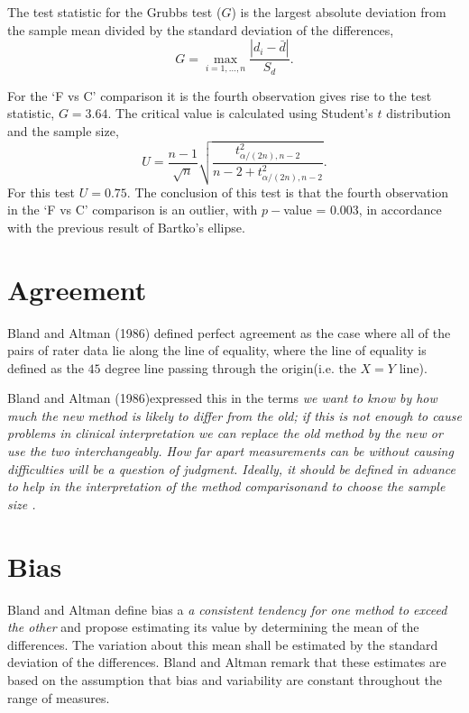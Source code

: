 \documentclass[12pt, a4paper]{report}
\theoremstyle{plain}
\theoremstyle{definition}
\theoremstyle{remark}
\begin{document}
	The test statistic for the Grubbs test ($G$) is the largest
	absolute deviation from the sample mean divided by the standard
	deviation of the differences,
	\begin{equation}
	G =  \displaystyle\max_{i=1,\ldots, n}\frac{\left \vert d_i -
		\bar{d}\right\vert}{S_{d}}.
	\end{equation}
	
	For the `F vs C' comparison it is the fourth observation gives
	rise to the test statistic, $G = 3.64$. The critical value is
	calculated using Student's $t$ distribution and the sample size,
	\[
	U = \frac{n-1}{\sqrt{n}} \sqrt{\frac{t_{\alpha/(2n),n-2}^2}{n - 2
			+ t_{\alpha/(2n),n-2}^2}}.
	\]
	For this test $U = 0.75$. The conclusion of this test is that the fourth observation in the `F vs C' comparison is an outlier, with $p-$value = 0.003, in accordance with the previous result of Bartko's ellipse.
	

	\section{Agreement} Bland and Altman (1986) defined perfect
	agreement as the case where all of the pairs of rater data lie
	along the line of equality, where the line of equality is defined
	as the $45$ degree line passing through the origin(i.e. the $X=Y$
	line).
	
	Bland and Altman (1986)expressed this in the terms \emph{we want
		to know by how much the new method is likely to differ from the
		old; if this is not enough to cause problems in clinical
		interpretation we can replace the old method by the new or use the
		two interchangeably. How far apart measurements can be without
		causing difficulties will be a question of judgment. Ideally, it
		should be defined in advance to help in the interpretation of the
		method comparisonand to choose the sample size .}
	\section{Bias}
	Bland and Altman define bias a \emph{a consistent tendency for one
		method to exceed the other} and propose estimating its value
	by determining the mean of the differences. The variation about
	this mean shall be estimated by the  standard deviation of the
	differences. Bland and Altman remark that these estimates are based on the
	assumption that bias and variability are constant throughout the
	range of measures.
\end{document}
